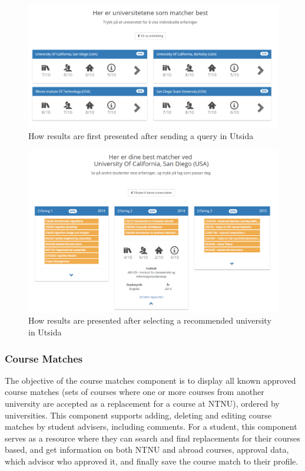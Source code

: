 \begin{figure}[h]
    \centering
    \includegraphics[width=1\textwidth]{fig/utsida_screenshots/results_1.PNG}
    \caption{How results are first presented after sending a query in Utsida}
    \label{fig:my_label}
\end{figure}

\begin{figure}[h]
    \centering
    \includegraphics[width=1\textwidth]{fig/utsida_screenshots/results_2.PNG}
    \caption{How results are presented after selecting a recommended university in Utsida}
    \label{fig:my_label}
\end{figure}

\subsubsection{Course Matches}
The objective of the course matches component is to display all known approved course matches (sets of courses where one or more courses from another university are accepted as a replacement for a course at NTNU), ordered by universities. This component supports adding, deleting and editing course matches by student advisers, including comments. For a student, this component serves as a resource where they can search and find replacements for their courses based, and get information on both NTNU and abroad courses, approval data, which advisor who approved it, and finally save the course match to their profile. 

